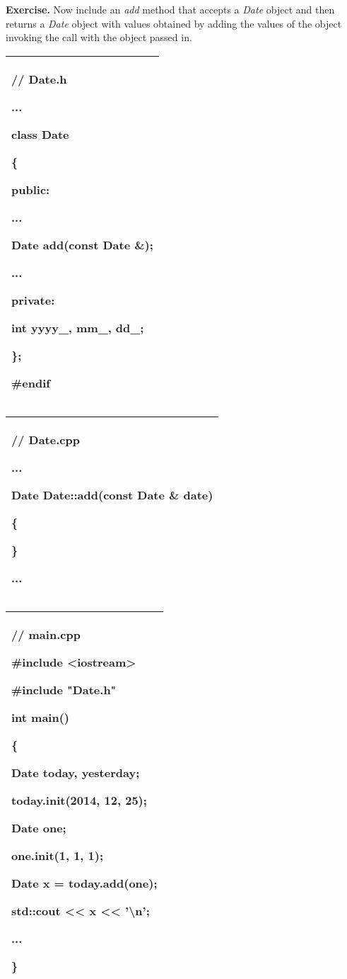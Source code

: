 \documentclass[
]{article}
\begin{document}
\textbf{\hfill\break
Exercise.} Now include an \emph{add} method that accepts a \emph{Date}
object and then returns a \emph{Date} object with values obtained by
adding the values of the object invoking the call with the object passed
in.

\begin{longtable}[]{@{}l@{}}
\toprule
\endhead
\begin{minipage}[t]{0.97\columnwidth}\raggedright
// Date.h

...

class Date

\{

public:

...

Date add(const Date \&);

...

private:

int yyyy\_, mm\_, dd\_;

\};

\#endif\strut
\end{minipage}\tabularnewline
\bottomrule
\end{longtable}

\begin{longtable}[]{@{}l@{}}
\toprule
\endhead
\begin{minipage}[t]{0.97\columnwidth}\raggedright
// Date.cpp

...

Date Date::add(const Date \& date)

\{

\}

...\strut
\end{minipage}\tabularnewline
\bottomrule
\end{longtable}

\begin{longtable}[]{@{}l@{}}
\toprule
\endhead
\begin{minipage}[t]{0.97\columnwidth}\raggedright
// main.cpp

\#include \textless iostream\textgreater{}

\#include "Date.h"

int main()

\{

Date today, yesterday;

today.init(2014, 12, 25);

Date one;

one.init(1, 1, 1);

Date x = today.add(one);

std::cout \textless\textless{} x \textless\textless{}
'\textbackslash n';

...

\}\strut
\end{minipage}\tabularnewline
\bottomrule
\end{longtable}
\end{document}
